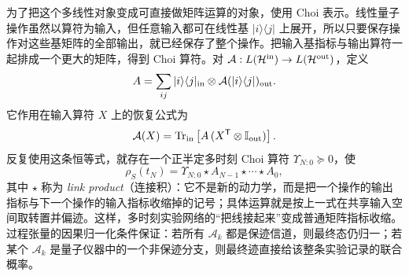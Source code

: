 为了把这个多线性对象变成可直接做矩阵运算的对象，使用 Choi 表示。线性量子操作虽然以算符为输入，但任意输入都可在线性基 $|i\rangle\langle j|$ 上展开，所以只要保存操作对这些基矩阵的全部输出，就已经保存了整个操作。把输入基指标与输出算符一起排成一个更大的矩阵，得到 Choi 算符。对
$\mathcal A:L(\mathcal H^{\rm in})\to L(\mathcal H^{\rm out})$，定义
\[
A
=\sum_{ij}|i\rangle\langle j|_{\rm in}
\otimes
\mathcal A(|i\rangle\langle j|)_{\rm out}.
\]
它作用在输入算符 $X$ 上的恢复公式为
\[
\mathcal A(X)
=\operatorname{Tr}_{\rm in}
\left[A\,(X^{\mathsf T}\otimes\mathbb I_{\rm out})\right].
\]
反复使用这条恒等式，就存在一个正半定多时刻 Choi 算符
$\Upsilon_{N:0}\succeq0$，使
\begin{equation}
\boxed{
\rho_S(t_N)
=\Upsilon_{N:0}
\star A_{N-1}\star\cdots\star A_0,}
\label{eq:process_tensor_choi_link}
\end{equation}
其中 $\star$ 称为 \emph{link product}（连接积）：它不是新的动力学，而是把一个操作的输出指标与下一个操作的输入指标收缩掉的记号；具体运算就是按上一式在共享输入空间取转置并偏迹。这样，多时刻实验网络的“把线接起来”变成普通矩阵指标收缩。过程张量的因果归一化条件保证：若所有 $\mathcal A_k$ 都是保迹信道，则最终态仍归一；若某个 $\mathcal A_k$ 是量子仪器中的一个非保迹分支，则最终迹直接给该整条实验记录的联合概率。

